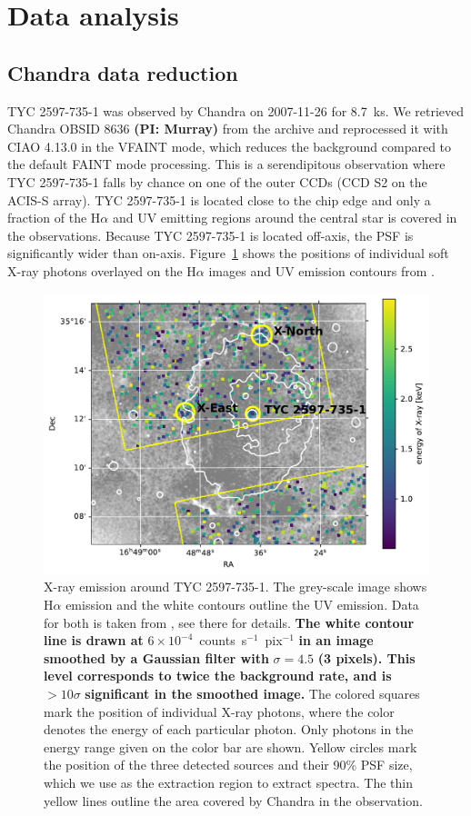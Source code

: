 \documentclass[linenumbers]{aastex631}
\begin{document}
\section{Data analysis} \label{sec:data}
\subsection{Chandra data reduction}
TYC 2597-735-1 was observed by Chandra on 2007-11-26 for 8.7~ks.
We retrieved Chandra OBSID 8636 \textbf{(PI: Murray)} from  the archive and reprocessed it with CIAO 4.13.0 \citep{2006SPIE.6270E..1VF} in the VFAINT mode, which reduces the background compared to the default FAINT mode processing. This is a serendipitous observation where TYC 2597-735-1 falls by chance on one of the outer CCDs (CCD S2 on the ACIS-S array). TYC 2597-735-1 is located close to the chip edge and only a fraction of the H$\alpha$ and UV emitting regions around the central star is covered in the observations. Because TYC 2597-735-1 is located off-axis, the PSF is significantly wider than on-axis. Figure~\ref{fig:chandraimage} shows the positions of individual soft X-ray photons overlayed on the H$\alpha$ images and UV emission contours from \citet{2020Natur.587..387H}.
\begin{figure}
    \centering
    \includegraphics[width=\textwidth]{figures/chandraimage.pdf}
\caption{X-ray emission around TYC 2597-735-1. The grey-scale image shows H$\alpha$ emission and the white contours outline the UV emission. Data for both is taken from \citet{2020Natur.587..387H}, see there for details. \textbf{The white contour line is drawn at} $6\times 10^{-4}$~counts~s$^{-1}$~pix$^{-1}$ \textbf{in an image smoothed by a Gaussian filter with} $\sigma=4.5$\arcsec{} \textbf{(3 pixels). This level corresponds to twice the background rate, and is} $>10\sigma$ \textbf{significant in the smoothed image.}
    The colored squares mark the position of individual X-ray photons, where the color denotes the energy of each particular photon. Only photons in the energy range given on the color bar are shown. Yellow circles mark the position of the three detected sources and their 90\% PSF size, which we use as the extraction region to extract spectra. The thin yellow lines outline the area covered by Chandra in the observation.}
    \label{fig:chandraimage}
\end{figure}
\end{document}
